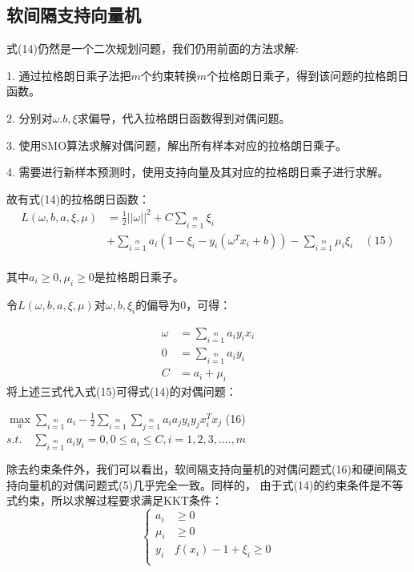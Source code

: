\documentclass[UTF8]{ctexart}
\begin{document}
{\subsection{软间隔支持向量机}
式(14)仍然是一个二次规划问题，我们仍用前面的方法求解:\par
1. 通过拉格朗日乘子法把$m$个约束转换$m$个拉格朗日乘子，得到该问题的拉格朗日函数。\par
2. 分别对$\omega.b,\xi$求偏导，代入拉格朗日函数得到对偶问题。\par
3. 使用SMO算法求解对偶问题，解出所有样本对应的拉格朗日乘子。\par
4. 需要进行新样本预测时，使用支持向量及其对应的拉格朗日乘子进行求解。\par
故有式(14)的拉格朗日函数：
\Large{
    \begin{align*}
        L(\omega,b,a,\xi,\mu)&=\frac{1}{2}||\omega||^2+C\sum\limits_{i=1}\limits^m\xi_i\\[2ex]
                             &+\sum\limits_{i=1}\limits^ma_i(1-\xi_i-y_i(\omega^Tx_i+b))-\sum\limits_{i=1}\limits^m\mu_i\xi_i\quad (15)
    \end{align*}
}\\
其中$a_i\geq 0,\mu_i\geq 0$是拉格朗日乘子。\par
令$L(\omega,b,a,\xi,\mu)$对$\omega,b,\xi_i$的偏导为0，可得：\par
\begin{align*}
    \omega &= \sum\limits_{i=1}\limits^ma_iy_ix_i\\[2ex]
         0 &= \sum\limits_{i=1}\limits^ma_iy_i\\[2ex]
         C &= a_i + \mu_i
\end{align*}
将上述三式代入式(15)可得式(14)的对偶问题：
\begin{center}
    \Large{
        $\max\limits_a\sum\limits_{i=1}\limits^ma_i-\frac{1}{2}\sum\limits_{i=1}\limits^m\sum\limits_{j=1}\limits^ma_ia_jy_iy_jx_i^Tx_j$ \quad (16)\\
        $s.t.\quad \sum\limits_{i=1}\limits^ma_iy_i=0,0\leq a_i\leq C,i=1,2,3,....,m$
    }
\end{center}
除去约束条件外，我们可以看出，软间隔支持向量机的对偶问题式(16)和硬间隔支持向量机的对偶问题式(5)几乎完全一致。同样的，
由于式(14)的约束条件是不等式约束，所以求解过程要求满足KKT条件：
\Large{
    $$\left\{
    \begin{aligned}
        a_i&\geq 0\\
        \mu_i&\geq 0\\
        y_i&f(x_i)-1+\xi_i\geq 0\\

\end{aligned}$$}}
\end{document}
